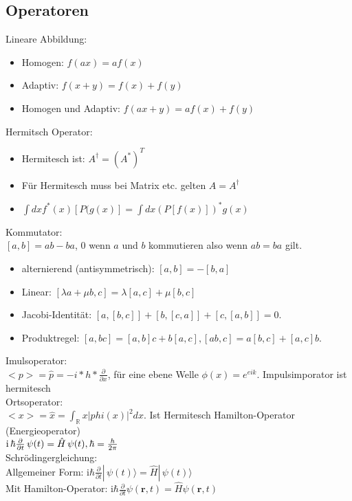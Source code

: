 \documentclass[10pt,a4paper]{article}
\begin{document}
\subsection{Operatoren}
Lineare Abbildung:
\begin{itemize}
\item Homogen: $f(ax) = af(x) $
\item Adaptiv: $f(x+y)= f(x) + f(y)$
\item Homogen und Adaptiv: $f(ax + y) = af(x) + f(y)$ 
\end{itemize}
%
Hermitsch Operator:
\begin{itemize}
\item Hermitesch ist: $A^{\dagger}  = (A^*)^T$
\item Für Hermitesch muss bei Matrix etc. gelten $ A = A^\dagger$
\item $\int dx f^*(x)[P(g(x)]= \int dx (P[f(x)])^*g(x)$
\end{itemize}
%
Kommutator:\\
$[a,b]=ab-ba$, $0$ wenn $a$ und $b$ kommutieren also wenn $ab=ba$ gilt.
\begin{itemize}
\item  alternierend (antisymmetrisch): $[a,b]=-[b,a]$
\item Linear: $ [\lambda a+\mu b,c]=\lambda [a,c] + \mu [b,c]$
\item Jacobi-Identität: $[a,[b,c]]+[b,[c,a]]+[c,[a,b]]=0.$
\item Produktregel: $[a,bc] = [a,b]c+b[a,c], [ab,c] = a[b,c]+[a,c]b.$
\end{itemize}
%
Imulsoperator:\\
$<p> = \hat p = -i*h*\frac{\partial}{\partial x}$, für eine ebene Welle $\phi(x)=e^{eik}$. Impulsimporator ist hermitesch\\
%
Ortsoperator:\\
$<x> = \hat x =  \int_{\mathbb{R}} x|phi(x)|^2 dx$. Ist Hermitesch
%
Hamilton-Operator (Energieoperator)\\
$\mathrm i \, \hbar {\partial \over \partial t} \, \psi (t) = \hat H \, \psi (t),\hbar = \frac{h}{2\pi}$\\
%
Schrödingergleichung:\\
Allgemeiner Form: $\mathrm{i}\hbar\frac{\partial}{\partial t} |\,\psi (t) \rangle = \hat{H} |\,\psi (t) \rangle$\\
%
Mit Hamilton-Operator: $\mathrm{i}\hbar\frac{\partial}{\partial t} \psi(\mathbf{r},t) = \hat H \psi(\mathbf{r},t)$
\end{document}
